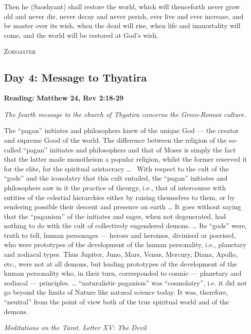 \begin{quotationx}
Then he (Saoshyant) shall restore the world, which will thenceforth never grow old and never die, never decay and never
perish, ever live and ever increase, and be master over its wish, when the dead will rise, when life and immortality
will come, and the world will be restored at God's wish. \begin{flushright} \textsc{Zoroaster}\end{flushright}

\end{quotationx}

\subsection*{Day 4: Message to Thyatira}
\textbf{Reading: Matthew 24, Rev 2:18-29}

\emph{The fourth message to the church of Thyatira concerns the Greco-Roman culture.}

\begin{quotationx}
The “pagan” initiates and philosophers knew of the unique God — the creator and supreme Good of the
world. The difference between the religion of the so-called “pagan” initiates and philosophers and that of Moses is
simply the fact that the latter made monotheism a popular religion, whilst the former reserved it for the elite, for
the spiritual aristocracy …  With respect to the cult of the “gods” and the iconolatry that this cult entailed, the
“pagan” initiates and philosophers saw in it the practice of theurgy, i.e., that of intercourse with entities of the
celestial hierarchies either by raising themselves to them, or by rendering possible their descent and presence on
earth … It goes without saying that the “paganism” of the initiates and sages, when not degenerated, had nothing to do
with the cult of collectively engendered demons. … Its “gods” were, truth to tell, human personages
— heroes and heroines, divinised or poerised, who were prototypes of the development of the human
personality, i.e., planetary and zodiacal types. Thus Jupiter, Juno, Mars, Venus, Mercury, Diana, Apollo, etc., were
not at all demons, but leading prototypes of the development of the human personality who, in their turn, corresponded
to cosmic — planetary and zodiacal — principles. … “naturalistic paganism”
was “cosmolatry”, i.e. it did not go beyond the limits of Nature like natural science today. It was, therefore,
“neutral” from the point of view both of the true spiritual world and of the demons. \begin{flushright} \emph{Meditations on the
Tarot. Letter XV: The Devil}\end{flushright}

\end{quotationx}

